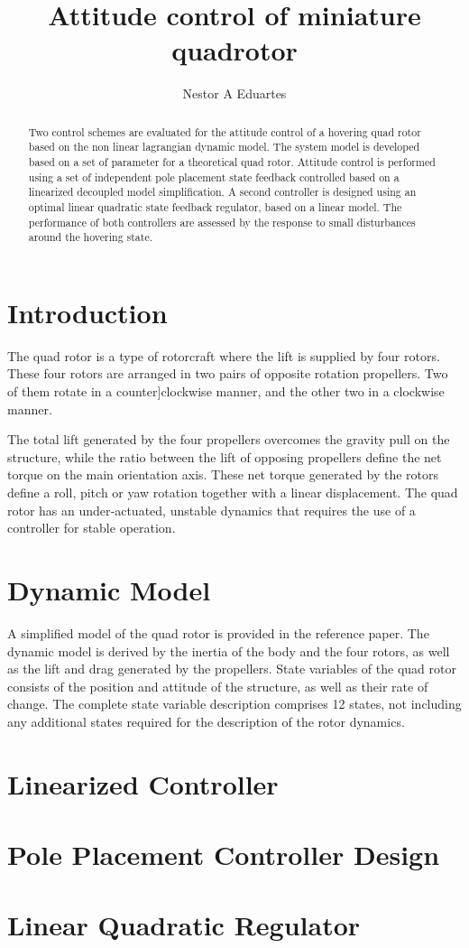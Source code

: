 \documentclass{article}
\title{Attitude control of miniature quadrotor}
\author{Nestor A Eduartes}
\begin{document}
 
\maketitle
 
\begin{abstract}
Two control schemes are evaluated for the attitude control of a hovering quad rotor based on the non linear lagrangian dynamic model. The system model is developed based on a set of parameter for a theoretical quad rotor. Attitude control is performed using a set of independent pole placement state feedback controlled based on a linearized decoupled model simplification. A second controller is designed using an optimal linear quadratic state feedback regulator, based on a linear model. The performance of both controllers are assessed by the response to small disturbances around the hovering state.
\end{abstract}

\section{Introduction}
The quad rotor is a type of rotorcraft where the lift is supplied by four rotors. These four rotors are arranged in two pairs of opposite rotation propellers. Two of them rotate in a counter]clockwise manner, and the other two in a clockwise manner.

The total lift generated by the four propellers overcomes the gravity pull on the structure, while the ratio between the lift of opposing propellers define the net torque on the main orientation axis. These net torque generated by the rotors define a roll, pitch or yaw rotation together with a linear displacement. The quad rotor has an under‐actuated, unstable dynamics that requires the use of a controller for stable operation.

\section{Dynamic Model}
A simplified model of the quad rotor is provided in the reference paper. The dynamic model is derived by the inertia of the body and the four rotors, as well as the lift and drag generated by the propellers. State variables of the quad rotor consists of the position and attitude of the structure, as well as their rate of change. The complete state variable description comprises 12 states, not including any additional states required for the description of the rotor dynamics.

\section{Linearized Controller}

\section{Pole Placement Controller Design}

\section{Linear Quadratic Regulator}

 
 
\end{document}

